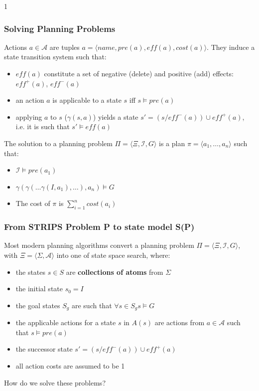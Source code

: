 \documentclass{beamer}
\def\masterclass{1}
\begin{document}
\if\masterclass1
	

	
	\begin{frame}[c]\frametitle{Solving Planning Problems}
		Actions $a \in \mathcal{A}$ are tuples $a = \langle \mathit{name}, \mathit{pre}(a), \mathit{eff}(a), \mathit{cost}(a) \rangle$.
		They induce a state transition system such that:
		\begin{itemize}
			\item $\mathit{eff}(a)$ constitute a set of negative (delete) and positive (add) effects: $\mathit{eff}^{+}(a)$, $\mathit{eff}^{-}(a)$
			\item an action $a$ is applicable to a state $s$ iff $s \models \mathit{pre}(a)$
			\item applying $a$ to $s$ ($\gamma(s,a)$) yields a state $s' = (s / \mathit{eff}^{-}(a)) \cup  \mathit{eff}^{+}(a)$, \\i.e. it is such that $s' \models \mathit{eff}(a)$
		\end{itemize}
		The solution to a planning problem $\Pi = \langle \Xi, \mathcal{I}, G\rangle$ is a plan $\pi = \langle a_1, \dots, a_n\rangle$ such that:
		\begin{itemize}
			\item $\mathcal{I} \models \mathit{pre}(a_1)$
			\item $\gamma(\gamma(\dots \gamma(I, a_1),\dots), a_n) \models G$
			\item The cost of $\pi$ is $\sum_{i=1}^{n}\mathit{cost}(a_i)$
		\end{itemize}
	\end{frame}
	
	\begin{frame}[c]\frametitle{From STRIPS Problem P to state model S(P)}
		Most modern planning algorithms convert a planning problem $\Pi = \langle \Xi, \mathcal{I}, G\rangle$, with $\Xi = \langle \Sigma, \mathcal{A} \rangle$ into one of state space search, where:
		\begin{itemize}
			\item the states $s \in S$ are \textbf{collections of atoms} from $\Sigma$
			\item the initial state $s_0 = I$
			\item the goal states $S_g$ are such that $\forall{s \in S_g} s \models G$
			\item the applicable actions for a state $s$ in $A(s)$ are actions from $a \in  \mathcal{A}$ such that $s \models \mathit{pre}(a)$
			\item the successor state $s' = (s / \mathit{eff}^{-}(a)) \cup  \mathit{eff}^{+}(a)$
			\item all action costs are assumed to be 1
		\end{itemize}
		How do we solve these problems?
	\end{frame}
	
\end{document}
